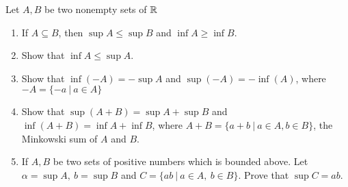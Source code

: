 Let $A,B$ be two nonempty sets of $\mathbb{R}$

\begin{enumerate}
	\item If $A \subseteq B$, then $\sup A \leq \sup B$ and $\inf A \geq \inf B$.
	\item Show that $\inf A \leq \sup A$.
	\item Show that $\inf (-A) = -\sup A$ and $\sup (-A) = -\inf (A)$, where $-A = \{-a ~|~ a \in A\}$
	\item Show that $\sup (A+B) = \sup A + \sup B$ and $\inf (A+B) = \inf A + \inf B$, where $A + B = \{a + b ~|~ a \in A,b \in B\}$, the Minkowski sum of $A$ and $B$.
	\item If $A,B$ be two sets of positive numbers which is bounded above. Let $\alpha = \sup A,~b = \sup B$ and $C = \{ab ~|~ a \in A ,~b \in B\}$. Prove that $\sup C = ab$.
\end{enumerate}


